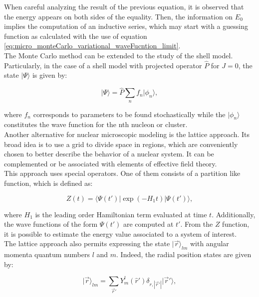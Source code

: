\documentclass[openany]{book}
\begin{document}
When careful analyzing the result of the previous equation, it is observed that the energy appears on both sides of the equality. Then, the information on $E_0$ implies the computation of an inductive series, which may start with a guessing function as calculated with the use of equation \ref{eq:micro_monteCarlo_variational_waveFucntion_limit}.\\

The Monte Carlo method can be extended to the study of the shell model. Particularly, in the case of a shell model with projected operator $\hat P$ for $J = 0$, the state $| \Psi \rangle$ is given by:
	
\begin{equation}\label{eq:micro_monteCarlo_projectedWaveFunction}
	| \Psi \rangle = \hat P \sum_{n} {f_n |\phi_n \rangle},
\end{equation}

where $f_n$ corresponds to parameters to be found stochastically while the $|\phi_n \rangle$ constitutes the wave function for the nth nucleon or cluster. \\ 
	
Another alternative for nuclear microscopic modeling is the lattice approach. Its broad idea is to use a grid to divide space in regions, which are conveniently chosen to better describe the behavior of a nuclear system. It can be complemented or be associated with elements of effective field theory. \\

This approach uses special operators. One of them consists of a partition like function, which is defined as: 

\begin{equation}\label{eq:micro_lattice_Z}
	Z(t) = \langle \Psi(t') | \exp {(-H_1 t)}|   \Psi(t') \rangle, 
\end{equation}

where $H_1$ is the leading order Hamiltonian term evaluated at time $t$. Additionally, the wave functions of the form $\Psi(t')$ are computed at $t'$. From the $Z$ function, it is possible to estimate the energy value associated to a system of interest. \\

The lattice approach also permits expressing the state $	| \vec r \rangle_{lm}$ with angular momenta quantum numbers $l$ and $m$.  Indeed, the radial position states are given by:

\begin{equation}\label{eq:micro_lattice_vector}
	| \vec r \rangle_{lm} = \sum_{\vec r'} { Y^{l}_{m} (\hat r') \delta_{r, |\vec r'|} |\vec r' \rangle},
\end{equation}
\end{document}
